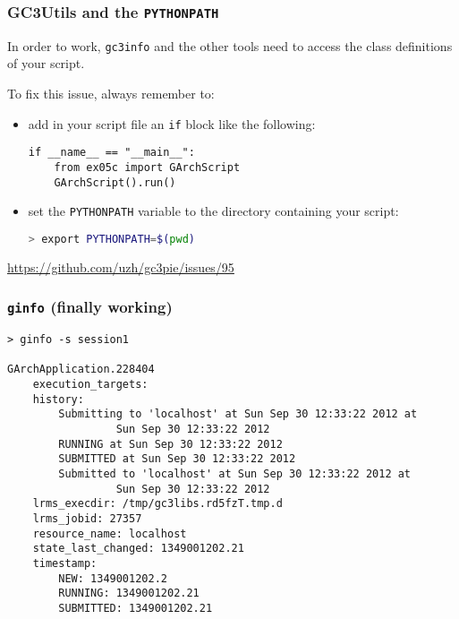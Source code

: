 \documentclass[english,serif,mathserif,xcolor=pdftex,dvipsnames,table]{beamer}
\begin{document}
\begin{frame}[fragile]
  \frametitle{GC3Utils and the \texttt{PYTHONPATH}}

  In order to work, \lstinline|gc3info| and the other tools need to
  access the class definitions of your script.

  \+
  To fix this issue, always remember to:
  \begin{itemize}

  \item add in your script file an \lstinline|if| block like the following:
    \begin{lstlisting}
if __name__ == "__main__":
    from ex05c import GArchScript
    GArchScript().run()
    \end{lstlisting}

  \item set the \lstinline|PYTHONPATH| variable to the directory
    containing your script:
    \begin{lstlisting}[language=sh]
      > export PYTHONPATH=$(pwd)
    \end{lstlisting}%
  \end{itemize}

  \begin{references}
    \url{https://github.com/uzh/gc3pie/issues/95}
  \end{references}

\end{frame}

\begin{frame}[fragile]
  \frametitle{\texttt{ginfo} (finally working)}
  \begin{lstlisting}[basicstyle=\tt\scriptsize]
    > ginfo -s session1

GArchApplication.228404
    execution_targets:
    history:
        Submitting to 'localhost' at Sun Sep 30 12:33:22 2012 at
                 Sun Sep 30 12:33:22 2012
        RUNNING at Sun Sep 30 12:33:22 2012
        SUBMITTED at Sun Sep 30 12:33:22 2012
        Submitted to 'localhost' at Sun Sep 30 12:33:22 2012 at
                 Sun Sep 30 12:33:22 2012
    lrms_execdir: /tmp/gc3libs.rd5fzT.tmp.d
    lrms_jobid: 27357
    resource_name: localhost
    state_last_changed: 1349001202.21
    timestamp:
        NEW: 1349001202.2
        RUNNING: 1349001202.21
        SUBMITTED: 1349001202.21
  \end{lstlisting}
\end{frame}
\end{document}
